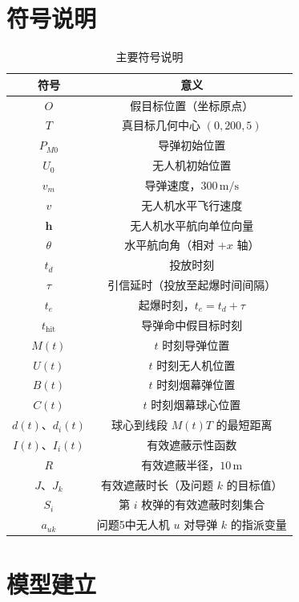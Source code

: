 \documentclass[withoutpreface,bwprint]{cumcmthesis}
\begin{document}
\section{符号说明}

\begin{table}[!htbp]
\centering
\caption{主要符号说明}
\label{tab:symbol}
\begin{tabular}{cc}
\toprule[1.5pt]
符号 & 意义 \\
\midrule[1pt]
$O$ & 假目标位置（坐标原点） \\
$T$ & 真目标几何中心 $(0,200,5)$ \\
$P_{M0}$ & 导弹初始位置 \\
$U_0$ & 无人机初始位置 \\
$v_m$ & 导弹速度，$300\,\mathrm{m/s}$ \\
$v$ & 无人机水平飞行速度 \\
$\mathbf{h}$ & 无人机水平航向单位向量 \\
$\theta$ & 水平航向角（相对 $+x$ 轴） \\
$t_d$ & 投放时刻 \\
$\tau$ & 引信延时（投放至起爆时间间隔） \\
$t_e$ & 起爆时刻，$t_e=t_d+\tau$ \\
$t_{\mathrm{hit}}$ & 导弹命中假目标时刻 \\
$M(t)$ & $t$ 时刻导弹位置 \\
$U(t)$ & $t$ 时刻无人机位置 \\
$B(t)$ & $t$ 时刻烟幕弹位置 \\
$C(t)$ & $t$ 时刻烟幕球心位置 \\
$d(t)$、$d_i(t)$ & 球心到线段 $M(t)T$ 的最短距离 \\
$I(t)$、$I_i(t)$ & 有效遮蔽示性函数 \\
$R$ & 有效遮蔽半径，$10\,\mathrm{m}$ \\
$J$、$J_k$ & 有效遮蔽时长（及问题 $k$ 的目标值） \\
$S_i$ & 第 $i$ 枚弹的有效遮蔽时刻集合 \\
$a_{uk}$ & 问题5中无人机 $u$ 对导弹 $k$ 的指派变量 \\
\bottomrule[1.5pt]
\end{tabular}
\end{table}

\section{模型建立}
\end{document}
